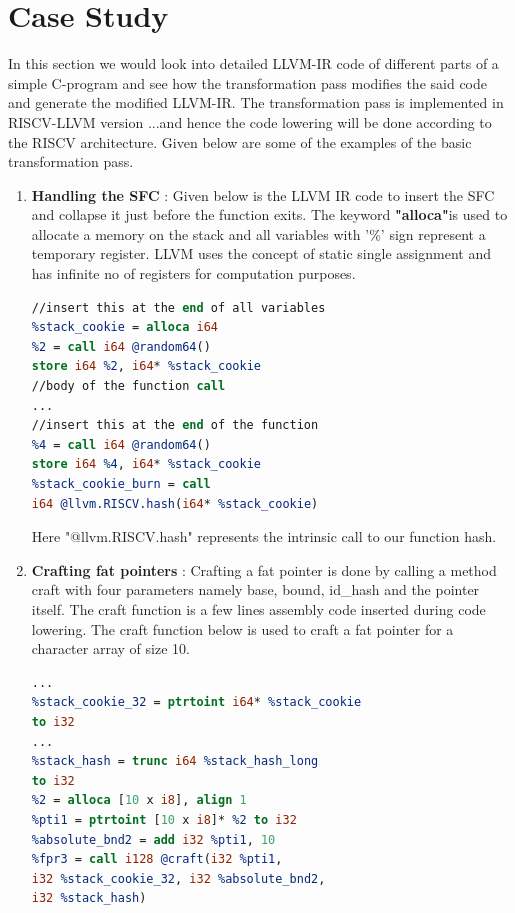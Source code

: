 \section{Case Study}

In this section we would look into detailed LLVM-IR code of different parts of a simple C-program and see how the transformation pass modifies the said code and generate the modified LLVM-IR. The transformation pass is implemented in RISCV-LLVM version ...and hence the code lowering will
be done according to the RISCV architecture. Given below are some of the examples of the basic transformation pass.

\begin{enumerate}
    \item \textbf{Handling the SFC } : Given below is the LLVM IR code to insert the SFC and collapse it just before the function exits. The keyword \textbf{"alloca"}is used to allocate a memory on the stack and all variables with '\%' sign represent a temporary register. LLVM uses the concept of static single assignment and has infinite no of registers for computation purposes.  
    \begin{lstlisting}[language=LLVM]
//insert this at the end of all variables
%stack_cookie = alloca i64
%2 = call i64 @random64()
store i64 %2, i64* %stack_cookie
//body of the function call
...
//insert this at the end of the function
%4 = call i64 @random64()
store i64 %4, i64* %stack_cookie
%stack_cookie_burn = call 
i64 @llvm.RISCV.hash(i64* %stack_cookie)
\end{lstlisting}
    Here "@llvm.RISCV.hash" represents the intrinsic call to our function hash.
    
    \item \textbf{Crafting fat pointers} : Crafting a fat pointer is done by calling a method craft with four parameters namely base, bound, id\_hash and the pointer itself. The craft function is a few lines assembly code  inserted during code lowering. The craft function below is used to craft a fat pointer for a character array of size 10. 
    \begin{lstlisting}[language=LLVM]
...
%stack_cookie_32 = ptrtoint i64* %stack_cookie 
to i32
...
%stack_hash = trunc i64 %stack_hash_long 
to i32
%2 = alloca [10 x i8], align 1
%pti1 = ptrtoint [10 x i8]* %2 to i32
%absolute_bnd2 = add i32 %pti1, 10
%fpr3 = call i128 @craft(i32 %pti1, 
i32 %stack_cookie_32, i32 %absolute_bnd2,
i32 %stack_hash)

    \end{lstlisting}
    

\end{enumerate}
